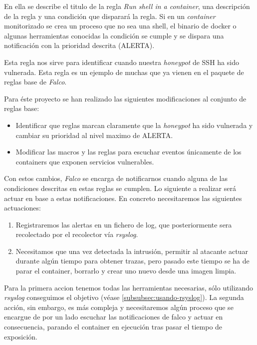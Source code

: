 En ella se describe el titulo de la regla \emph{Run shell in a container}, una descripción de la regla y una condición que disparará la regla.
Si en un \emph{container } monitorizado se crea un proceso que no sea una shell, el binario de docker o algunas herramientas conocidas
la condición se cumple y se dispara una notificación con la prioridad descrita (ALERTA).

Esta regla nos sirve para identificar cuando nuestra \emph{honeypot} de SSH ha sido vulnerada. Esta regla es un ejemplo de muchas
que ya vienen en el paquete de reglas base de \emph{Falco}. 

Para éste proyecto se han realizado las siguientes modificaciones al conjunto de reglas base:

\begin{itemize}
    \item Identificar que reglas  marcan claramente que la \emph{honeypot} ha sido vulnerada
    y cambiar su prioridad al nivel maximo de ALERTA.
    \item Modificar las macros y las reglas para escuchar eventos únicamente de los containers que exponen servicios vulnerables.
\end{itemize}

Con estos cambios, \emph{Falco} se encarga de notificarnos cuando alguna de las condiciones descritas en estas reglas se cumplen.
Lo siguiente a realizar será actuar en base a estas notificaciones. En concreto necesitaremos las siguientes actuaciones:

\begin{enumerate}
    \item Registraremos las alertas en un fichero de log, que posteriormente sera recolectado por el recolector vía \emph{rsyslog}.
    \item Necesitamos que una vez detectada la intrusión, permitir al atacante actuar durante algún tiempo para obtener trazas, pero
    pasado este tiempo se ha de parar el container, borrarlo y crear uno nuevo desde una imagen limpia.
\end{enumerate}

Para la primera accion tenemos todas las herramientas necesarias, sólo utilizando \emph{rsyslog} conseguimos el objetivo (véase \ref{subsubsec:usando-rsyslog}).
La segunda acción, sin embargo, es más compleja y necesitaremos algún proceso que se encargue de por un lado escuchar las notificaciones de falco y 
actuar en consecuencia, parando el container en ejecución tras pasar el tiempo de exposición. 

